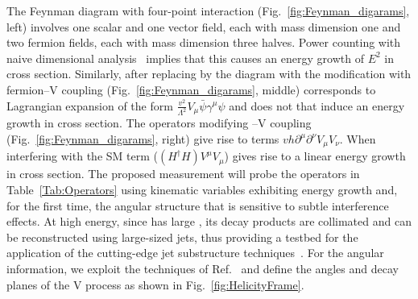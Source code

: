 \documentclass[a4paper,11pt]{article}
\renewcommand{\PV}{{{{V}}}\xspace}
\newcommand{\VH}{{{\PV}{\PH}}\xspace}
\begin{document}
The Feynman diagram with four-point interaction (Fig.~\ref{fig:Feynman_digarams}, left) involves one scalar and one vector field, each with mass dimension one and two fermion fields, each with mass dimension three halves.
Power counting with naive dimensional analysis~\cite{Manohar:1983md} implies that this causes an energy growth of $E^2$ in cross section. 
Similarly, after replacing \PH by  the diagram with the modification with fermion--\PV coupling (Fig.~\ref{fig:Feynman_digarams}, middle) 
corresponds to Lagrangian expansion of the form $\frac{v^2}{{\Lambda}^2} V_{\mu} \bar{\psi} {{\gamma}^{\mu}} {\psi}$ %
and does not that induce an energy growth in cross section. 
The operators modifying \PH--\PV coupling (Fig.~\ref{fig:Feynman_digarams}, right) give rise to terms $vh {\partial}^{\mu}{\partial}^{\nu} V_{\mu}V_{\nu}$.
When interfering with the SM term ($(H^{\dagger}H) V^{\mu}V_{\mu}$) gives rise to a linear energy growth in cross section.
The proposed measurement will probe the operators in Table~\ref{Tab:Operators} 
using kinematic variables exhibiting energy growth and, for the first time, the angular structure that is sensitive to subtle interference effects.
At high energy, since \PH has large \pt, its decay products are collimated and can be reconstructed using large-sized jets, thus providing a testbed for the application of the cutting-edge jet substructure techniques~\cite{Qu:2019gqs,Sirunyan:2020lcu}.
For the angular information, we exploit the techniques of Ref.~\cite{Banerjee:2019twi} and define the angles and decay planes of the \VH process as shown in Fig.~\ref{fig:HelicityFrame}.
\end{document}
